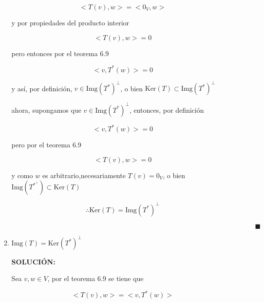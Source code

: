 \documentclass[12pt,a4paper]{article}
\begin{document}
\begin{enumerate}
\begin{enumerate}
        \begin{equation*}
            <T(v),w> = <0_V,w>
        \end{equation*}
        
        y por propiedades del producto interior
        
        \begin{equation*}
            <T(v),w> = 0
        \end{equation*}
        
        pero entonces por el teorema 6.9
        
        \begin{equation*}
            <v,T^{*}(w)> = 0
        \end{equation*}
        
        y así, por definición, $v \in \text{Img}(T^{*})^{\perp}$, o bien $\text{Ker} (T) \subset \text{Img}(T^{*})^{\bot}$
        
        ahora, supongamos que $v \in \text{Img}(T^{*})^{\bot}$, entonces, por definición
        
        \begin{equation*}
            <v,T^{*}(w)> = 0
        \end{equation*}
        
        pero por el teorema 6.9
        
        \begin{equation*}
            <T(v),w>= 0
        \end{equation*}
        
        y como $w$ es arbitrario,necesariamente $T(v) = 0_V$, o bien $\text{Img}(T^{*}^{\bot}) \subset \text{Ker}(T)$
        
        \begin{equation*}
            \therefore     \text{Ker} (T) = \text{Img}(T^{*})^{\bot}  
        \end{equation*}
        
        $\hspace{15cm} \blacksquare$
        
        \item $\text{Img} (T) = \text{Ker}(T^{*})^{\bot}$
        
        \textbf{SOLUCIÓN:}
        
        Sea $v,w \in V$, por el teorema 6.9 se tiene que
        
        \begin{equation*}
            <T(v), w> = <v, T^{*}(w)>
        \end{equation*}
        

\end{enumerate}
\end{enumerate}
\end{document}
